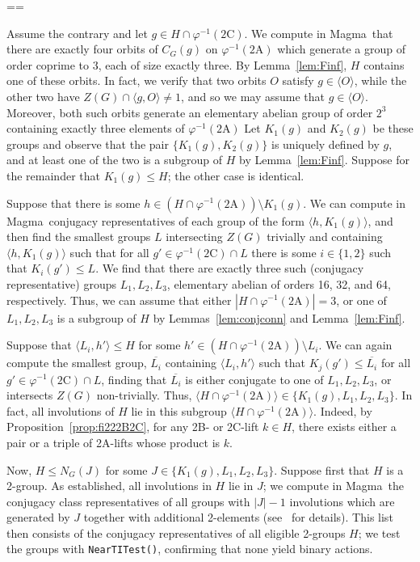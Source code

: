 \documentclass[11pt, a4paper]{amsart}
\makeatletter
\newcommand{\magma}{{\sc Magma}}
\renewcommand{\proofname}{Proof}
\renewenvironment{proof}[1][\proofname]{\par
  \pushQED{\qed}  \normalfont \partopsep=\z@skip \topsep=\z@skip
  \trivlist
  \item[\hskip\labelsep
        \scshape
    #1\@addpunct{.}]\ignorespaces
}{  \popQED\endtrivlist\@endpefalse
}
\makeatother
\begin{document}
\begin{proof}
    Assume the contrary and let $g\in H\cap\varphi^{-1}(\mathrm{2C})$. We compute in \magma~that there are exactly four orbits of $C_G(g)$ on $\varphi^{-1}(\mathrm{2A})$ which generate a group of order coprime to 3, each of size exactly three. By Lemma~\ref{lem:Finf}, $H$ contains one of these orbits. In fact, we verify that two orbits $O$ satisfy $g\in\langle O\rangle$, while the other two have $Z(G)\cap \langle g,O\rangle\ne 1$, and so we may assume that $g\in \langle O\rangle$. Moreover, both such orbits generate an elementary abelian group of order $2^3$ containing exactly three elements of $\varphi^{-1}(\mathrm{2A})$ Let $K_1(g)$ and $K_2(g)$ be these groups and observe that the pair $\{K_1(g),K_2(g)\}$ is uniquely defined by $g$, and at least one of the two is a subgroup of $H$ by Lemma~\ref{lem:Finf}. Suppose for the remainder that $K_1(g)\leq H$; the other case is identical.

    Suppose that there is some $h\in (H\cap\varphi^{-1}(\mathrm{2A}))\setminus K_1(g)$. We can compute in \magma~conjugacy representatives of each group of the form $\langle h,K_1(g)\rangle$, and then find the smallest groups $L$ intersecting $Z(G)$ trivially and containing $\langle h,K_1(g)\rangle$ such that for all $g'\in \varphi^{-1}(\mathrm{2C})\cap L$ there is some $i\in\{1,2\}$ such that $K_i(g')\leq L$. We find that there are exactly three such (conjugacy representative) groups $L_1,L_2,L_3$, elementary abelian of orders 16, 32, and 64, respectively. Thus, we can assume that either $|H\cap\varphi^{-1}(\mathrm{2A})|=3$, or one of $L_1,L_2,L_3$ is a subgroup of $H$ by Lemmas~\ref{lem:conjconn} and Lemma~\ref{lem:Finf}.

    Suppose that $\langle L_i,h'\rangle\leq H$ for some $h'\in (H\cap\varphi^{-1}(\mathrm{2A}))\setminus L_i$. We can again compute the smallest group, $\overline{L_i}$ containing $\langle L_i,h'\rangle$ such that $K_j(g')\leq \overline{L_i}$ for all $g'\in \varphi^{-1}(\mathrm{2C})\cap L$, finding that $\overline{L_i}$ is either conjugate to one of $L_1,L_2,L_3$, or intersects $Z(G)$ non-trivially. Thus, $\langle H\cap \varphi^{-1}(\mathrm{2A})\rangle\in\{K_1(g),L_1,L_2,L_3\}$. In fact, all involutions of $H$ lie in this subgroup $\langle H\cap \varphi^{-1}(\mathrm{2A})\rangle$. Indeed, by Proposition~\ref{prop:fi222B2C}, for any 2B- or 2C-lift $k\in H$, there exists either a pair or a triple of 2A-lifts whose product is $k$.

    Now, $H\leq N_G(J)$ for some $J\in\{K_1(g),L_1,L_2,L_3\}$.     Suppose first that $H$ is a 2-group. As established, all involutions in $H$ lie in $J$; we compute in \magma~the conjugacy class representatives of all groups with $|J|-1$ involutions which are generated by $J$ together with additional 2-elements (see~\cite{comps} for details). This list then consists of the conjugacy representatives of all eligible 2-groups $H$; we test the groups with {\tt NearTITest()}, confirming that none yield binary actions. 
    

\end{proof}
\end{document}
